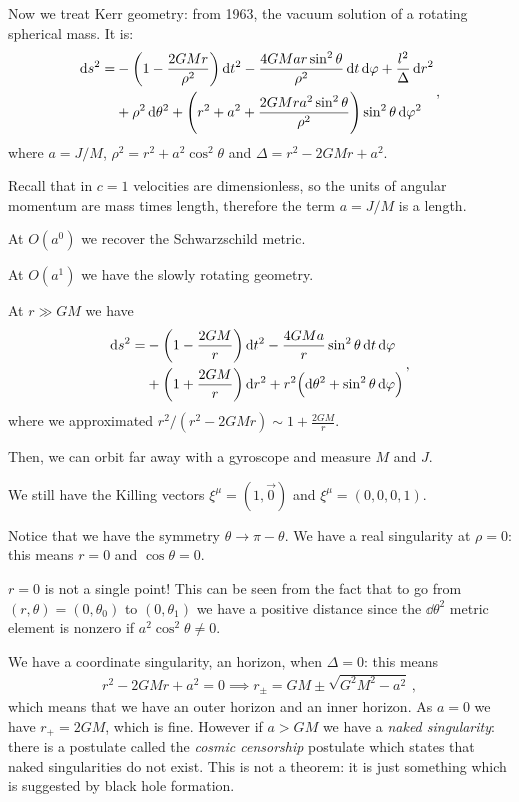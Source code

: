 \documentclass[main.tex]{subfiles}
\begin{document}
Now we treat Kerr geometry: from 1963, the vacuum solution of a rotating spherical mass. It is: 
%
\begin{align}
    \begin{split}    
    \dd{s^2} = 
    &- \qty(1 - \frac{2GMr}{\rho^2}) \dd{t^2} - 
    \frac{4GMar \sin^2\theta }{\rho^2} \dd{t} \dd{\varphi }
    + \frac{l^2}{\Delta } \dd{r^2} \\
    &+ \rho^2 \dd{\theta^2} + \qty(r^2+a^2 + \frac{2GMr a^2 \sin^2\theta }{\rho^2}) \sin^2 \theta \dd{\varphi^2}
    \end{split}
\,,
\end{align}
%
where \(a = J/M\), \(\rho^2= r^2+a^2 \cos^2\theta  \) and \(\Delta = r^2 - 2GMr +a^2\). 

Recall that in \(c=1\) velocities are dimensionless, so the units of angular momentum are mass times length, therefore the term \(a = J/M\) is a length. 

At \(O(a^{0})\) we recover the Schwarzschild metric. 

At \(O(a^{1})\) we have the slowly rotating geometry. 

At \(r \gg GM\) we have 
%
\begin{align}
  \begin{split}    
  \dd{s^2} = &- \qty(1 - \frac{2GM}{r}) \dd{t^2}
  - \frac{4GMa}{r} \sin^2 \theta \dd{t} \dd{\varphi } \\
  &+ \qty(1 + \frac{2GM}{r}) \dd{r^2} 
  + r^2 \qty(\dd{\theta^2} + \sin^2 \theta \dd{\varphi })
  \end{split}
\,,
\end{align}
%
where we approximated \(r^2/(r^2-2GMr) \sim 1 + \frac{2GM}{r}\). 

Then, we can orbit far away with a gyroscope and measure \(M\) and \(J\). 

We still have the Killing vectors \(\xi^{\mu } = (1, \vec{0})\) and \(\xi^{\mu }= (0,0,0,1)\). 

Notice that we have the symmetry \(\theta \rightarrow \pi - \theta \). We have a real singularity at \(\rho =0\): this means \(r =0 \) and \(\cos \theta =0\). 

\(r=0\) is not a single point! This can be seen from the fact that to go from \((r, \theta ) = (0, \theta_0 )\) to \((0, \theta_1 )\) we have a positive distance since the \(\dd{\theta^2} \) metric element is nonzero if \(a^2 \cos^2\theta \neq 0\). 

We have a coordinate singularity, an horizon, when \(\Delta = 0\): this means 
%
\begin{align}
  r^2 - 2GMr + a^2 = 0 \implies r_{\pm} =GM \pm \sqrt{G^2M^2-a^2}
\,,
\end{align}
%
which means that we have an outer horizon and an inner horizon. As \(a=0\) we have \(r_+ = 2GM\), which is fine.
However if \(a> GM\) we have a \emph{naked singularity}: there is a postulate called the \emph{cosmic censorship} postulate which states that naked singularities do not exist. 
This is not a theorem: it is just something which is suggested by black hole formation. 
\end{document}
